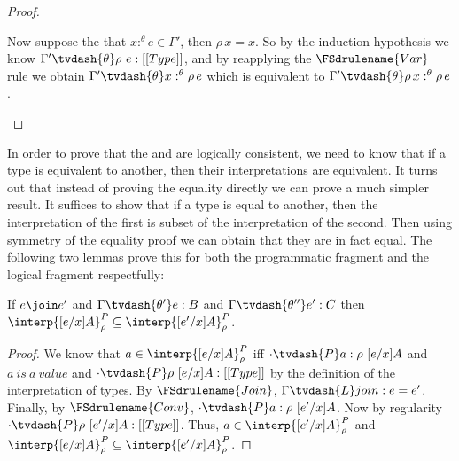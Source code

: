 \begin{proof}
\begin{itemize}
    Now suppose the that $x:^{\theta} e \in \Gamma'$, then $\rho\,x = x$.  So by the induction
    hypothesis we know $\Gamma' \tvdash{\theta} \rho\ e:[[Type]]$, and by reapplying the
    $\FSdrulename{Var}$ rule we obtain $\Gamma' \tvdash{\theta} x:^{\theta} \rho\,e$ which is equivalent
    to $\Gamma' \tvdash{\theta} \rho\,x:^{\theta} \rho\,e$.
  \end{itemize}
\end{proof}

In order to prove that the  and 
are logically consistent, we need to know that if a type is equivalent
to another, then their interpretations are equivalent.  It turns out
that instead of proving the equality directly we can prove a much
simpler result.  It suffices to show that if a type is equal to
another, then the interpretation of the first is subset of the
interpretation of the second.  Then using symmetry of the equality
proof we can obtain that they are in fact equal.  The following two
lemmas prove this for both the programmatic fragment and the logical
fragment respectfully:

\begin{lemma}
  \label{lemma:pconv_in_interp_are_equiv}
  If $e \join e'$ and $\Gamma \tvdash{\theta'} e:B$ and 
  $\Gamma \tvdash{\theta''} e':C$ then 
  $\interp{[e/x]A}^P_\rho \subseteq \interp{[e'/x]A}^P_\rho$.
\end{lemma}
\begin{proof}
  We know that $a \in \interp{[e/x]A}^P_\rho$
  iff $\cdot \tvdash{P} a:\rho\ [e/x]A$ and $a\ is\ a\ value$ and $
  \cdot \tvdash{P} \rho\ [e/x]A:[[Type]]$ 
  by the definition of the interpretation of types.
  By $\FSdrulename{Join}$, $\Gamma \tvdash{L} join:e = e'$. Finally, by 
  $\FSdrulename{Conv}$, 
  $\cdot \tvdash{P} a:\rho\ [e'/x]A$.  Now by regularity $\cdot \tvdash{P} \rho\ [e'/x]A:[[Type]]$.
  Thus, $a \in \interp{[e'/x]A}^P_\rho$ and
  $\interp{[e/x]A}^P_\rho \subseteq \interp{[e'/x]A}^P_\rho$.
\end{proof}

